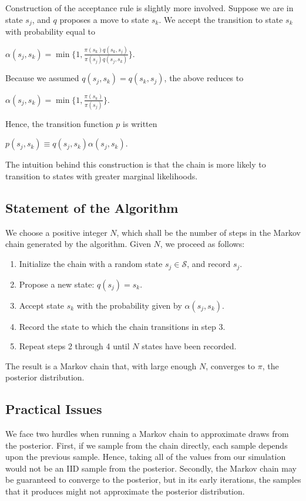 \documentclass[12pt,twoside]{reedthesis}
\begin{document}
			Construction of the acceptance rule is slightly more involved. 
			Suppose we are in state $s_j$, and $q$ proposes a move to state $s_k$. 
			We accept the transition to state $s_k$ with probability equal to
			\begin{center}
			$ \alpha(s_j,s_k) = \min\{1, \frac{\pi(s_k)q(s_k, s_j)}{\pi(s_j)q(s_j, s_k)}\}$.
			\end{center}
			Because we assumed $q(s_j,s_k) = q(s_k, s_j)$, the above reduces to
			\begin{center} 
			$
			\alpha(s_j,s_k) = \min\{1, \frac{\pi(s_k)}{\pi(s_j)}\}.
			$
			\end{center}
			Hence, the transition function $p$ is written
			\begin{center}
				$p(s_j,s_k) \equiv q(s_j,s_k) \alpha(s_j,s_k)$.
			\end{center}
			The intuition behind this construction is that the chain is more likely to transition to states
			with greater marginal likelihoods. 
		\subsection*{Statement of the Algorithm}
			We choose a positive integer $N$, 
			which shall be the number of steps in the Markov chain generated by the algorithm.
			Given $N$, we proceed as follows:
			\begin{enumerate}
				\item Initialize the chain with a random state $s_j \in \mathcal S$, and record $s_j$.
				\item Propose a new state: $q(s_j) = s_k$.
				\item Accept state $s_k$ with the probability given by $\alpha(s_j,s_k)$. 
				\item Record the state to which the chain transitions in step 3.
				\item Repeat steps 2 through 4 until $N$ states have been recorded.
			\end{enumerate}
			The result is a Markov chain that, with large enough $N$, 
			converges to $\pi$, the posterior distribution.
		\subsection*{Practical Issues}
			We face two hurdles when running a Markov chain to approximate draws from the posterior. 
			First, if we sample from the chain directly, each sample depends upon the previous sample. 
			Hence, taking all of the values from our simulation would not be an IID sample from the posterior. 
			Secondly, the Markov chain may be guaranteed to converge to the posterior, but in its early iterations, the samples that it produces might not approximate the posterior distribution. 
			
\end{document}
